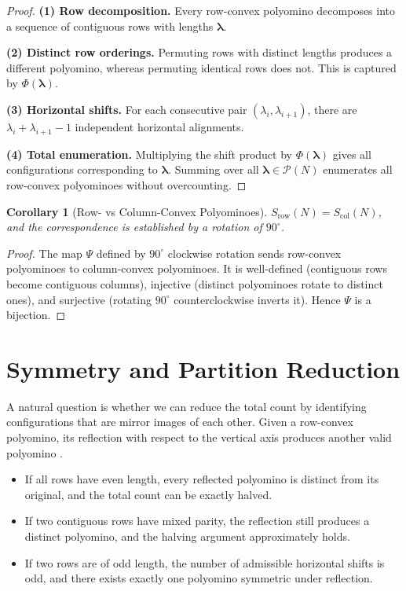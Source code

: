 \documentclass{article}
\theoremstyle{definition}
\theoremstyle{plain}
\newtheorem{corollary}[theorem]{Corollary}
\begin{document}
\begin{proof}
\textbf{(1) Row decomposition.} Every row-convex polyomino decomposes into 
a sequence of contiguous rows with lengths $\boldsymbol{\lambda}$.

\textbf{(2) Distinct row orderings.} Permuting rows with distinct lengths 
produces a different polyomino, whereas permuting identical rows does not. 
This is captured by $\Phi(\boldsymbol{\lambda})$.

\textbf{(3) Horizontal shifts.} For each consecutive pair 
$(\lambda_i, \lambda_{i+1})$, there are $\lambda_i + \lambda_{i+1} - 1$ 
independent horizontal alignments.

\textbf{(4) Total enumeration.} Multiplying the shift product by 
$\Phi(\boldsymbol{\lambda})$ gives all configurations corresponding to 
$\boldsymbol{\lambda}$. Summing over all $\boldsymbol{\lambda} \in 
\mathcal{P}(N)$ enumerates all row-convex polyominoes without overcounting.
\end{proof}

\begin{corollary}[Row- vs Column-Convex Polyominoes]
\label{cor:rowcol}
$S_{\mathrm{row}}(N) = S_{\mathrm{col}}(N)$, and the correspondence is 
established by a rotation of $90^\circ$.
\end{corollary}

\begin{proof}
The map $\Psi$ defined by $90^\circ$ clockwise rotation sends row-convex 
polyominoes to column-convex polyominoes. It is well-defined (contiguous 
rows become contiguous columns), injective (distinct polyominoes rotate to 
distinct ones), and surjective (rotating $90^\circ$ counterclockwise 
inverts it). Hence $\Psi$ is a bijection.
\end{proof}

\section{Symmetry and Partition Reduction}

A natural question is whether we can reduce the total count by identifying 
configurations that are mirror images of each other. Given a row-convex 
polyomino, its reflection with respect to the vertical axis produces 
another valid polyomino \cite{LEROUX1998343}.

\begin{itemize}
    \item If all rows have even length, every reflected polyomino is 
    distinct from its original, and the total count can be exactly halved.
    \item If two contiguous rows have mixed parity, the reflection still 
    produces a distinct polyomino, and the halving argument approximately 
    holds.
    \item If two rows are of odd length, the number of admissible 
    horizontal shifts is odd, and there exists exactly one polyomino 
    symmetric under reflection.
\end{itemize}
\end{document}
